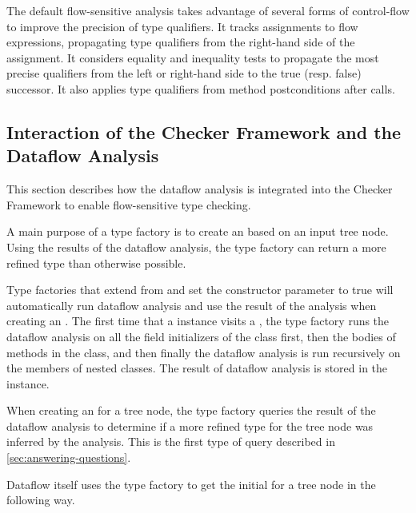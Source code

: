 The default flow-sensitive analysis takes advantage of several forms
of control-flow to improve the precision of type qualifiers.  It
tracks assignments to flow expressions, propagating type qualifiers
from the right-hand side of the assignment.  It considers equality and
inequality tests to propagate the most precise qualifiers from the
left or right-hand side to the true (resp. false) successor.  It also
applies type qualifiers from method postconditions after calls.



\subsection{Interaction of the Checker Framework and the Dataflow Analysis}
\label{sec:flow-cf-interaction}

This section describes how the dataflow analysis is integrated into the
Checker Framework to enable flow-sensitive type checking.

A main purpose of a type factory is to create an 
based on an input tree node. Using the results of the dataflow analysis,
the type factory can return a more refined type than otherwise possible.

Type factories that extend from 
and set the constructor parameter  to true will automatically
run dataflow analysis and use the result of the analysis when creating an
.  The first time that a 
instance visits a , the type factory runs the dataflow analysis
on all the field initializers of the class first, then the bodies of methods in
the class, and then finally the dataflow analysis is
run recursively on the members of nested classes. The result of
dataflow analysis is stored in the  instance.

When creating an  for a tree node, the type factory
queries the result of the dataflow analysis to determine if a more refined
type for the tree node was inferred by the analysis. This is the first
type of query described in \autoref{sec:answering-questions}.

Dataflow itself uses the type factory to get the initial
 for a tree node in the following way.

